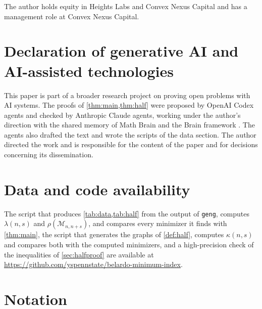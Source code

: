 \documentclass[11pt]{article}
\theoremstyle{definition}
\theoremstyle{remark}
\begin{document}
The author holds equity in Heights Labs and Convex Nexus Capital and has a management role at Convex Nexus Capital.

\section*{Declaration of generative AI and AI-assisted technologies}

This paper is part of a broader research project on proving open problems with AI systems.
The proofs of \cref{thm:main,thm:half} were proposed by OpenAI Codex agents and checked by Anthropic Claude agents, working under the
author's direction with the shared memory of Math Brain \cite{MathBrainRepo,MathBrainPaper} and the Brain framework
\cite{BrainFramework}. The agents also drafted the text and wrote the scripts of the data section. The author directed the work and is responsible for the content of the paper and for decisions
concerning its dissemination.

\section*{Data and code availability}

The script that produces \cref{tab:data,tab:half} from the output of \texttt{geng}, computes $\lambda(n,s)$ and
$\rho(\mathcal M_{n,n+s})$, and compares every minimizer it finds with \cref{thm:main}, the script that generates the
graphs of \cref{def:half}, computes $\kappa(n,s)$ and compares both with the computed minimizers, and a high-precision
check of the
inequalities of \cref{sec:halfproof} are available at\newline
\url{https://github.com/yspennstate/belardo-minimum-index}.

\appendix
\section{Notation}\label{app:notation}
\end{document}
